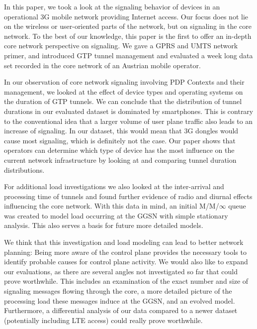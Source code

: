 In this paper, we took a look at the signaling behavior of devices in an operational \ac{3G} mobile network providing Internet access. Our focus does not lie on the wireless or user-oriented parts of the network, but on signaling in the core network. To the best of our knowledge, this paper is the first to offer an in-depth core network perspective on signaling. We gave a \ac{GPRS} and \ac{UMTS} network primer, and introduced \ac{GTP} tunnel management and evaluated a week long data set recorded in the core network of an Austrian mobile operator.

In our observation of core network signaling involving \ac{PDP} Contexts and their management, we looked at the effect of device types and operating systems on the duration of \ac{GTP} tunnels. We can conclude that the distribution of tunnel durations in our evaluated dataset is dominated by smartphones. This is contrary to the conventional idea that a larger volume of user plane traffic also leads to an increase of signaling. In our dataset, this would mean that 3G dongles would cause most signaling, which is definitely not the case. Our paper shows that operators can determine which type of device has the most influence on the current network infrastructure by looking at and comparing tunnel duration distributions.

For additional load investigations we also looked at the inter-arrival and processing time of tunnels and found further evidence of radio and diurnal effects influencing the core network. With this data in mind, an initial M/M/$\infty$ queue was created to model load occurring at the \ac{GGSN} with simple stationary analysis. This also serves a basis for future more detailed models.

We think that this investigation and load modeling can lead to better network planning: Being more aware of the control plane provides the necessary tools to identify probable causes for control plane activity. We would also like to expand our evaluations, as there are several angles not investigated so far that could prove worthwhile. This includes an examination of the exact number and size of signaling messages flowing through the core, a more detailed picture of the processing load these messages induce at the \ac{GGSN}, and an evolved model. Furthermore, a differential analysis of our data compared to a newer dataset (potentially including \ac{LTE} access) could really prove worthwhile.

